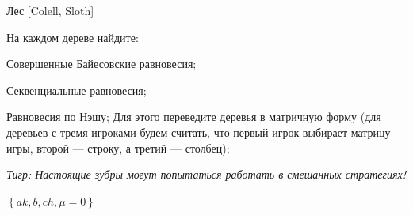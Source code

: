 \begin{problem}
 Лес [Colell, Sloth]\par
На каждом дереве найдите:\par
Совершенные Байесовские равновесия;\par
Секвенциальные равновесия;\par
Равновесия по Нэшу; Для этого переведите деревья в матричную форму (для деревьев с тремя игроками будем считать, что первый игрок выбирает матрицу игры, второй — строку, а третий — столбец);\par
%
%
%




{\it Тигр: Настоящие зубры могут попытаться работать в смешанных стратегиях!}\par




\begin{sol}

  $\left\{ak,b,ch,\mu =0\right\}$\par


\end{sol}
\end{problem}
